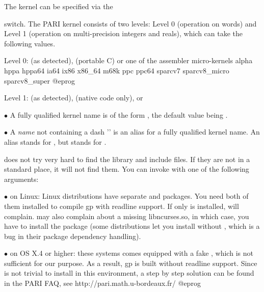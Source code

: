  The kernel can be specified via the


\noindent switch. The PARI kernel consists of two levels: Level 0 (operation
on words) and Level 1 (operation on multi-precision integers and reals),
which can take the following values.

Level 0:  (as detected),  (portable C) or
one of the assembler micro-kernels
\bprog
  alpha
  hppa hppa64
  ia64
  ix86 x86_64
  m68k
  ppc ppc64
  sparcv7 sparcv8_micro sparcv8_super
@eprog

Level 1:  (as detected),  (native code only), or 

\noindent$\bullet$ A fully qualified kernel name is of the form
, the default value being .

\noindent$\bullet$ A \emph{name} not containing a dash '\kbd{-}' is an alias
for a fully qualified kernel name. An alias stands for
, but  stands for .

 does not try very hard to find the  library and
include files. If they are not in a standard place, it will not find them.
You can invoke  with one of the following arguments:





$\bullet$ on Linux: Linux distributions have separate  and
 packages. You need both of them installed to
compile gp with readline support. If only  is installed,
 will complain.  may also complain about a
missing libncurses.so, in which case, you have to install the
 package (some distributions let you install
 without , which is a bug in
their package dependency handling).

$\bullet$ on OS X.4 or higher: these systems comes equipped with a fake
, which is not sufficient for our purpose. As a result, gp is
built without readline support. Since  is not trivial to
install in this environment, a step by step solution can be found in the PARI
FAQ, see
\bprog
  http://pari.math.u-bordeaux.fr/
@eprog

